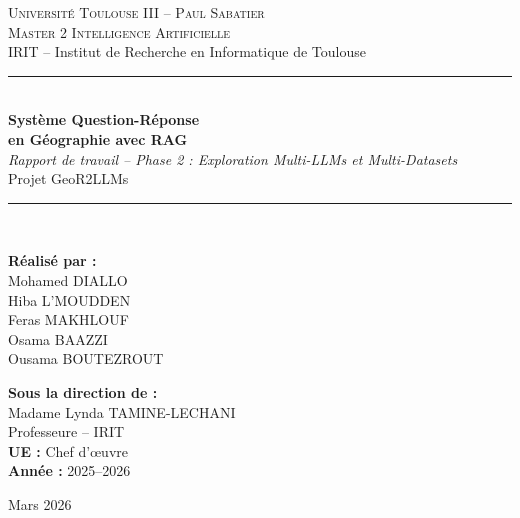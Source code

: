 \documentclass[12pt,a4paper]{article}
\begin{document}
\begin{titlepage}
  \centering
  \vspace*{1cm}

  {\Large\textsc{Universit\'e Toulouse III -- Paul Sabatier}}\\[0.3cm]
  {\large\textsc{Master 2 Intelligence Artificielle}}\\[0.2cm]
  {\normalsize IRIT -- Institut de Recherche en Informatique de Toulouse}\\[2cm]

  \rule{\textwidth}{1.5pt}\\[0.6cm]
  {\huge\bfseries Syst\`eme Question-R\'eponse\\[0.3cm] en G\'eographie avec RAG}\\[0.4cm]
  {\Large\textit{Rapport de travail -- Phase 2 : Exploration Multi-LLMs et Multi-Datasets}}\\[0.3cm]
  {\large Projet GeoR2LLMs}\\[0.4cm]
  \rule{\textwidth}{1.5pt}\\[2cm]

  \begin{minipage}{0.45\textwidth}
    \begin{flushleft}
      \textbf{R\'ealis\'e par :}\\[0.3cm]
      Mohamed DIALLO\\
      Hiba L'MOUDDEN\\
      Feras MAKHLOUF\\
      Osama BAAZZI\\
      Ousama BOUTEZROUT
    \end{flushleft}
  \end{minipage}
  \hfill
  \begin{minipage}{0.45\textwidth}
    \begin{flushright}
      \textbf{Sous la direction de :}\\[0.3cm]
      Madame Lynda TAMINE-LECHANI\\
      Professeure -- IRIT\\[0.5cm]
      \textbf{UE :} Chef d'\oe uvre\\
      \textbf{Ann\'ee :} 2025--2026
    \end{flushright}
  \end{minipage}

  \vfill
  {\large Mars 2026}
\end{titlepage}
\end{document}
